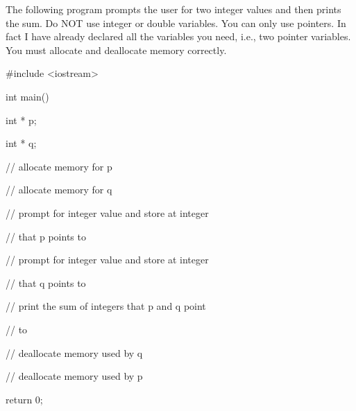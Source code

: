 The following program prompts the user for two integer values and then prints the sum. Do NOT use integer or double variables. You can only use pointers. In fact I have already declared all the variables you need, i.e., two pointer variables. You must allocate and deallocate memory correctly.



\begin{consolethree}[escapeinside=||]

#include <iostream>



int main()

{

    int * p;

    int * q;



    // allocate memory for p



    // allocate memory for q



    // prompt for integer value and store at integer



    // that p points to



    // prompt for integer value and store at integer



    // that q points to



    // print the sum of integers that p and q point



    // to

    

    // deallocate memory used by q



    // deallocate memory used by p



   return 0;

}

\end{consolethree}

